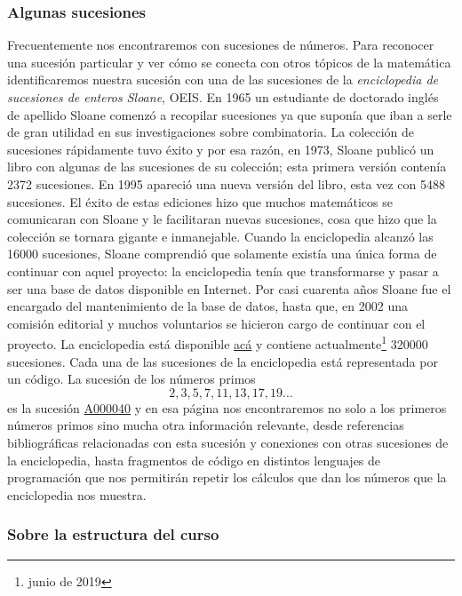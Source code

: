 \subsubsection*{Algunas sucesiones}
Frecuentemente nos encontraremos con sucesiones de números. Para reconocer 
una sucesión particular y ver cómo se conecta con otros tópicos de la matemática
identificaremos nuestra sucesión con una de las sucesiones de la
\emph{enciclopedia de sucesiones de enteros Sloane}, OEIS. En 1965 un
estudiante de doctorado inglés de apellido Sloane comenzó a recopilar
sucesiones ya que suponía que iban a serle de gran utilidad en sus
investigaciones sobre combinatoria. La colección de sucesiones rápidamente tuvo
éxito y por esa razón, en 1973, Sloane publicó un libro con algunas de las
sucesiones de su colección; esta primera versión contenía 2372 sucesiones. En
1995 apareció una nueva versión del libro, esta vez con 5488 sucesiones. El
éxito de estas ediciones hizo que muchos matemáticos se comunicaran con Sloane
y le facilitaran nuevas sucesiones, cosa que hizo que la colección se tornara
gigante e inmanejable. Cuando la enciclopedia alcanzó las 16000 sucesiones,
Sloane comprendió que solamente existía una única forma de continuar con aquel
proyecto: la enciclopedia tenía que transformarse y pasar a ser una base de datos
disponible en Internet. Por casi cuarenta años Sloane fue el encargado del
mantenimiento de la base de datos, hasta que, en 2002 una comisión editorial y
muchos voluntarios se hicieron cargo de continuar con el proyecto. La
enciclopedia está disponible \href{https://oeis.org/}{acá} y contiene
actualmente\footnote{junio de 2019} 320000 sucesiones. Cada una de las
sucesiones de la enciclopedia está representada por un código. La sucesión de
los números primos
\[
	2,3,5,7,11,13,17,19\dots
\]
es la sucesión \href{https://oeis.org/A000040}{A000040} y en esa página 
nos encontraremos no solo a los primeros números primos sino mucha otra
información relevante, desde referencias bibliográficas relacionadas con esta
sucesión y conexiones con otras sucesiones de la enciclopedia, hasta fragmentos
de código en distintos lenguajes de programación que nos permitirán repetir los
cálculos que dan los números que la enciclopedia nos muestra. 


\subsubsection*{Sobre la estructura del curso}

